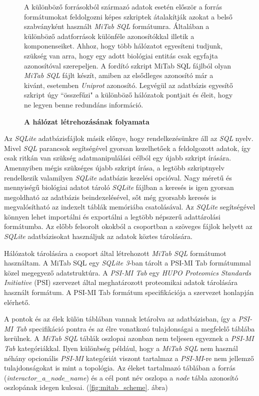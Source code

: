 \documentclass[a4paper,12pt]{article}
\newenvironment{imgdesc}{
		\small
		\singlespacing
		\begin{center}

	}{
		\end{center}
	}
\begin{document}
\begin{figure}[H]
			 		 \caption{ \textbf{A hálózat létrehozásának folyamata} }

 			 		 \begin{imgdesc}
 				 		 A különböző forrásokból származó adatok esetén először a forrás formátumokat feldolgozni képes szkriptek átalakítják azokat a belső szabványként használt \textit{MiTab SQL} formátumra. Általában a különböző adatforrások különféle azonosítókkal illetik a komponenseiket. Ahhoz, hogy több hálózatot egyesíteni tudjunk, szükség van arra, hogy egy adott biológiai entitás csak egyfajta azonosítóval szerepeljen. A fordító szkript MiTab SQL fájlból olyan \textit{MiTab SQL} fájlt készít, amiben az elsődleges azonosító már a kivánt, esetemben \textit{Uniprot} azonosító. Legvégül az adatbázis egyesítő szkript úgy ``összefűzi" a különböző hálózatok pontjait és éleit, hogy ne legyen benne redundáns információ.
 			 		 \end{imgdesc}

			 		 \label{fig:slk3uml}
			 	 \end{figure}





		 Az \textit{SQLite} adatbázisfájlok másik előnye, hogy rendelkezésünkre áll az \textit{SQL} nyelv. Mivel \textit{SQL} parancsok segítségével gyorsan kezelhetőek a feldolgozott adatok, így csak ritkán van szükség adatmanipulálási célból egy újabb szkript írására. Amennyiben mégis szükséges újabb szkript írása, a legtöbb szkriptnyelv rendelkezik valamilyen \textit{SQLite} adatbázis kezelési opcióval. Nagy méretű és mennyiségű biológiai adatot tároló \textit{SQLite} fájlban a keresés is igen gyorsan megoldható az adatbázis beindexelésével, sőt még gyorsabb keresés is megvalósítható az indexelt táblák memóriába csatolásával. Az \textit{SQLite} segítségével könnyen lehet importálni és exportálni a legtöbb népszerű adattárolási formátumba. Az előbb felsorolt okokból a csoportban a szöveges fájlok helyett az \textit{SQLite} adatbázisokat használjuk az adatok köztes tárolására.

		Hálózatok tárolására a csoport által létrehozott \textit{MiTab SQL} formátumot használtam. A MiTab SQL egy \textit{SQLite 3}-ban tárolt a PSI-MI Tab formátummal közel megegyező adatstruktúra. A \textit{PSI-MI Tab} egy \textit{HUPO Proteomics Standards Initiative} (PSI) szervezet által meghatározott proteomikai adatok tárolására használt formátum. A PSI-MI Tab formátum specifikációja a szervezet honlapján elérhető. \cite{hupo}

		A pontok és az élek külön táblában vannak letárolva az adatbázisban, így a \textit{PSI-MI Tab} specifikáció pontra és az élre vonatkozó tulajdonságai a megfelelő táblába kerülnek. A \textit{MiTab SQL} táblák oszlopai azonban nem teljesen egyeznek a \textit{PSI-MI Tab} kategóriákkal. Ilyen különbség például, hogy a \textit{MiTab SQL} nem használ néhány opcionális \textit{PSI-MI} kategóriát viszont tartalmaz a \textit{PSI-MI}-re nem jellemző tulajdonságokat is mint a topológia. Az éleket tartalmazó táblában a forrás (\textit{interactor\_a\_node\_name}) és a cél pont név oszlopa a \textit{node} tábla azonosító oszlopának idegen kulcsai. (\ref{fig:mitab_scheme}. ábra)
\end{document}
